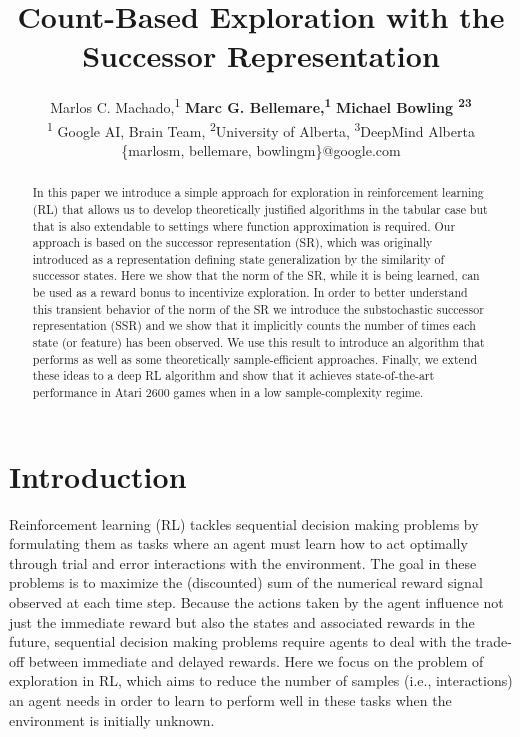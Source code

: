 \documentclass[letterpaper]{article} \usepackage{aaai20}  \usepackage{times}  \usepackage{helvet} \usepackage{courier}  \usepackage[hyphens]{url}  \usepackage{graphicx} \urlstyle{rm} \def\UrlFont{\rm}  \usepackage{graphicx}  \frenchspacing  \setlength{\pdfpagewidth}{8.5in}  \setlength{\pdfpageheight}{11in}  \usepackage{booktabs}
\title{Count-Based Exploration with the Successor Representation}
\author{Marlos C. Machado,\textsuperscript{\rm 1} \Large \textbf{Marc G. Bellemare,\textsuperscript{\rm 1}} \Large \textbf{Michael Bowling \textsuperscript{\rm 2}\textsuperscript{\rm 3}}\\ \textsuperscript{\rm 1} Google AI, Brain Team, \textsuperscript{\rm 2}University of Alberta,
\textsuperscript{\rm 3}DeepMind Alberta\\
\{marlosm, bellemare, bowlingm\}@google.com }
\begin{document}
\maketitle

\begin{abstract}
In this paper we introduce a simple approach for exploration in reinforcement learning (RL) that allows us to develop theoretically justified algorithms in the tabular case but that is also extendable to settings where function approximation is required. Our approach is based on the successor representation (SR), which was originally introduced as a representation defining state generalization by the similarity of successor states. Here we show that the norm of the SR, while it is being learned, can be used as a reward bonus to incentivize exploration. In order to better understand this transient behavior of the norm of the SR we introduce the substochastic successor representation (SSR) and we show that it implicitly counts the number of times each state (or feature) has been observed. We use this result to introduce an algorithm that performs as well as some theoretically sample-efficient approaches. Finally, we extend these ideas to a deep RL algorithm and show that it achieves state-of-the-art performance in Atari 2600 games when in a low sample-complexity regime.
\end{abstract}

\section{Introduction}
Reinforcement learning (RL) tackles sequential decision making problems by formulating them as tasks where an agent must learn how to act optimally through trial and error interactions with the environment. The goal in these problems is to maximize the (discounted) sum of the numerical reward signal observed at each time step. Because the actions taken by the agent influence not just the immediate reward but also the states and associated rewards in the future, sequential decision making problems require agents to deal with the trade-off between immediate and delayed rewards. Here we focus on the problem of exploration in RL, which aims to reduce the number of samples (i.e., interactions) an agent needs in order to learn to perform well in these tasks when the environment is initially unknown.
\end{document}
